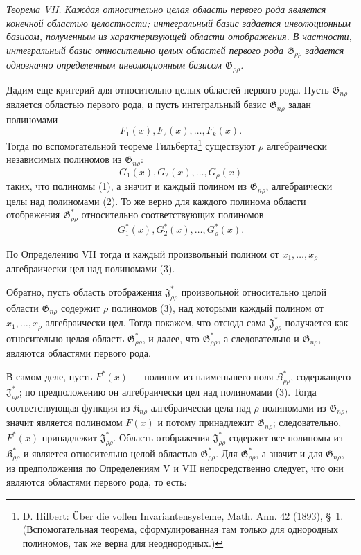 \documentclass[11pt]{article}
\providecommand{\Kfield}{\mathfrak{K}}
\providecommand{\Jdom}{\mathfrak{J}}
\providecommand{\Gdom}{\mathfrak{G}}
\begin{document}
\emph{Теорема VII. Каждая относительно целая область первого рода является конечной областью целостности; интегральный базис задается инволюционным базисом, полученным из характеризующей области отображения. В частности, интегральный базис относительно целых областей первого рода $\Gdom_{\rho\rho}$ задается однозначно определенным инволюционным базисом $\Gdom_{\rho\rho}$.}

Дадим еще критерий для относительно целых областей первого рода. Пусть $\Gdom_{n\rho}$ является областью первого рода, и пусть интегральный базис $\Gdom_{n\rho}$ задан полиномами
\begin{equation}
  F_1(x),F_2(x),\ldots,F_k(x).
\tag{1}
\end{equation}
Тогда по вспомогательной теореме Гильберта\footnote{D. Hilbert: Über die vollen Invariantensysteme, Math. Ann. 42 (1893), \S\ 1. (Вспомогательная теорема, сформулированная там только для однородных полиномов, так же верна для неоднородных.)} существуют $\rho$ алгебраически независимых полиномов из $\Gdom_{n\rho}$:
\begin{equation}
  G_1(x),G_2(x),\ldots,G_\rho(x)
\tag{2}
\end{equation}
таких, что полиномы (1), а значит и каждый полином из $\Gdom_{n\rho}$, алгебраически целы над полиномами (2). То же верно для каждого полинома области отображения $\Gdom^*_{\rho\rho}$ относительно соответствующих полиномов
\begin{equation}
  G_1^*(x),G_2^*(x),\ldots,G_\rho^*(x).
\tag{3}
\end{equation}

По Определению VII тогда и каждый произвольный полином от $x_1,\ldots,x_\rho$ алгебраически цел над полиномами (3).

Обратно, пусть область отображения $\Jdom^*_{\rho\rho}$ произвольной относительно целой области $\Gdom_{n\rho}$ содержит $\rho$ полиномов (3), над которыми каждый полином от $x_1,\ldots,x_\rho$ алгебраически цел. Тогда покажем, что отсюда сама $\Jdom^*_{\rho\rho}$ получается как относительно целая область $\Gdom^*_{\rho\rho}$, и далее, что $\Gdom^*_{\rho\rho}$, а следовательно и $\Gdom_{n\rho}$, являются областями первого рода.

В самом деле, пусть $F^*(x)$ --- полином из наименьшего поля $\Kfield^*_{\rho\rho}$, содержащего $\Jdom^*_{\rho\rho}$; по предположению он алгебраически цел над полиномами (3). Тогда соответствующая функция из $\Kfield_{n\rho}$ алгебраически цела над $\rho$ полиномами из $\Gdom_{n\rho}$, значит является полиномом $F(x)$ и потому принадлежит $\Gdom_{n\rho}$; следовательно, $F^*(x)$ принадлежит $\Jdom^*_{\rho\rho}$. Область отображения $\Jdom^*_{\rho\rho}$ содержит все полиномы из $\Kfield^*_{\rho\rho}$ и является относительно целой областью $\Gdom^*_{\rho\rho}$. Для $\Gdom^*_{\rho\rho}$, а значит и для $\Gdom_{n\rho}$, из предположения по Определениям V и VII непосредственно следует, что они являются областями первого рода, то есть:
\end{document}
